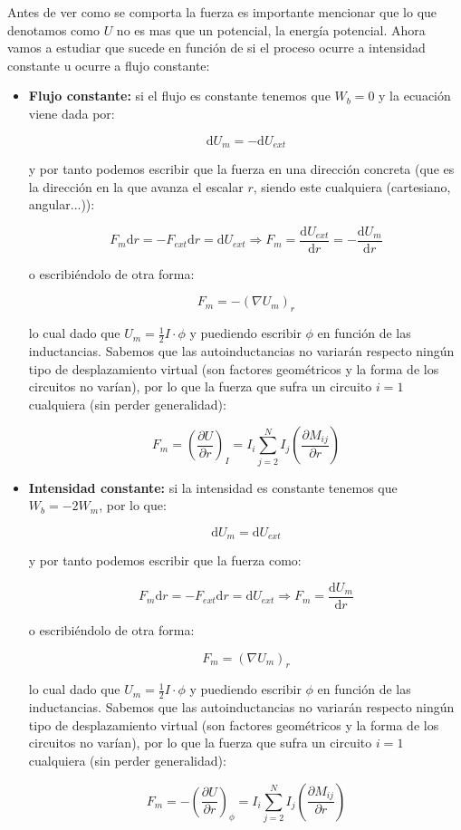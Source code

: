 \documentclass[12pt]{article}
\newcommand{\parentesis}[1]{\left( #1  \right)}
\newcommand{\parciales}[2]{\frac{\partial #1}{\partial #2}}
\newcommand{\pparciales}[2]{\parentesis{\parciales{#1}{#2}}}
\newcommand{\D}{\mathrm{d}}
\begin{document}
Antes de ver como se comporta la fuerza es importante mencionar que lo que denotamos como $U$ no es mas que un potencial, la energía potencial. Ahora vamos a estudiar que sucede en función de si el proceso ocurre a intensidad constante u ocurre a flujo constante:

\begin{itemize}
\item \textbf{Flujo constante:} si el flujo es constante tenemos que $W_b = 0$ y la ecuación viene dada por:

$$ \D U_m = - \D U_{ext} $$

y por tanto podemos escribir que la fuerza en una dirección concreta (que es la dirección en la que avanza el escalar $r$, siendo este cualquiera (cartesiano, angular...)):

$$ F_{m} \D r =  - F_{ext} \D r =\D U_{ext} \Longrightarrow F_{m} = \dfrac{\D U_{ext}}{\D r} = - \dfrac{\D U_m}{\D r}$$

o escribiéndolo de otra forma:

\begin{equation}
F_m = - (\nabla U_m)_{r}
\end{equation}

lo cual dado que $U_m = \frac{1}{2} I \cdot \phi$  y puediendo escribir $\phi$ en función de las inductancias. Sabemos que las autoinductancias no variarán respecto ningún tipo de desplazamiento virtual (son factores geométricos y la forma de los circuitos no varían), por lo que la fuerza que sufra un circuito $i=1$ cualquiera (sin perder generalidad):

\begin{equation}
F_m = \pparciales{U}{r}_{I} =   I_i \sum_{j=2}^N I_j \pparciales{M_{ij}}{r}
\end{equation}

\item \textbf{Intensidad constante:} si la intensidad es constante tenemos que $W_b = - 2 W_m$, por lo que:

$$ \D U_m =  \D U_{ext} $$

y por tanto podemos escribir que la fuerza como:

$$ F_{m} \D r =  - F_{ext} \D r =\D U_{ext} \Longrightarrow F_{m} =   \dfrac{\D U_m}{\D r}$$

o escribiéndolo de otra forma:

\begin{equation}
F_m =  (\nabla U_m)_{r}
\end{equation}

lo cual dado que $U_m = \frac{1}{2} I \cdot \phi$  y puediendo escribir $\phi$ en función de las inductancias. Sabemos que las autoinductancias no variarán respecto ningún tipo de desplazamiento virtual (son factores geométricos y la forma de los circuitos no varían), por lo que la fuerza que sufra un circuito $i=1$ cualquiera (sin perder generalidad):

\begin{equation}
F_m = - \pparciales{U}{r}_{\phi} =   I_i \sum_{j=2}^N I_j \pparciales{M_{ij}}{r}
\end{equation}


\end{itemize}
\end{document}

